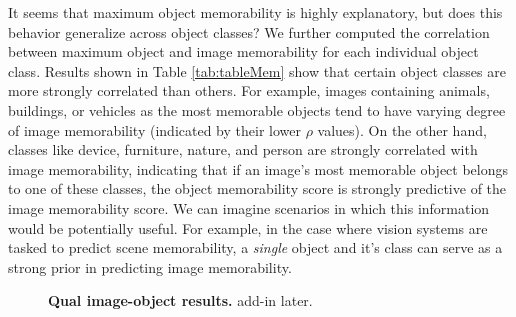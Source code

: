 It seems that maximum object memorability is highly explanatory, but does this behavior generalize across object classes? We further computed the correlation between maximum object and image memorability for each individual object class. Results shown in  Table \ref{tab:tableMem} show that certain object classes are more strongly correlated than others.  For example, images containing animals, buildings, or vehicles as the most memorable objects tend to have varying degree of image memorability (indicated by their lower $\rho$ values). On the other hand, classes like device, furniture, nature, and person are strongly correlated with image memorability, indicating that if an image's most memorable object belongs to one of these classes, the object memorability score is strongly predictive of the image memorability score. We can imagine scenarios in which this information would be potentially useful. For example, in the case where vision systems are tasked to predict scene memorability, a \textit{single} object and it’s class can serve as a strong prior in predicting image memorability.

\begin{table}[t]
    \caption{\footnotesize\textbf{Max object memorability and image memorability.} add-in later. }\label{tab:tableMem}
\end{table}


\begin{figure}[!b]
\centering
{}
\vspace{-5mm}\caption{\footnotesize\textbf{Qual image-object results.} add-in later. }\label{fig:imMemQual}
\end{figure}



